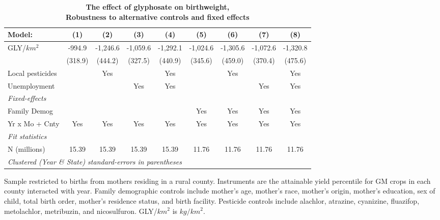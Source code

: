 \begin{table}[htbp]
   \centering
   \small
   \begin{threeparttable}[b]
      \caption{\label{tab:robust-cntrl-dbwt-allyielddiffpercentilegmo} \textbf{The effect of glyphosate on birthweight, \\ Robustness to alternative controls and fixed effects}}
      \begin{tabular}{lcccccccc}
         \toprule
         Model:           & (1)     & (2)      & (3)      & (4)      & (5)      & (6)      & (7)      & (8)\\  
         \midrule 
         GLY/$km^2$       & -994.9  & -1,246.6 & -1,059.6 & -1,292.1 & -1,024.6 & -1,305.6 & -1,072.6 & -1,320.8\\   
                          & (318.9) & (444.2)  & (327.5)  & (440.9)  & (345.6)  & (459.0)  & (370.4)  & (475.6)\\   
         Local pesticides &         & Yes      &          & Yes      &          & Yes      &          & Yes\\  
         Unemployment     &         &          & Yes      & Yes      &          &          & Yes      & Yes\\  
         \midrule
         \emph{Fixed-effects}\\
         Family Demog     &         &          &          &          & Yes      & Yes      & Yes      & Yes\\  
         Yr x Mo + Cnty   & Yes     & Yes      & Yes      & Yes      & Yes      & Yes      & Yes      & Yes\\  
         \midrule
         \emph{Fit statistics}\\
         N (millions)     & 15.39   & 15.39    & 15.39    & 15.39    & 11.76    & 11.76    & 11.76    & 11.76\\  
         \midrule
         \multicolumn{9}{l}{\emph{Clustered (Year \& State) standard-errors in parentheses}}\\
      \end{tabular}
      
      \begin{tablenotes}\item Sample restricted to births from mothers residing in a rural county. Instruments are the attainable yield percentile for GM crops in each county interacted with year. Family demographic controls include mother's age, mother's race, mother's origin, mother's education, sex of child, total birth order, mother's residence status, and birth facility. Pesticide controls include alachlor, atrazine, cyanizine, fluazifop, metolachlor, metribuzin, and nicosulfuron. GLY/$km^2$ is $kg/km^2$.
      \end{tablenotes}
   \end{threeparttable}
\end{table}
